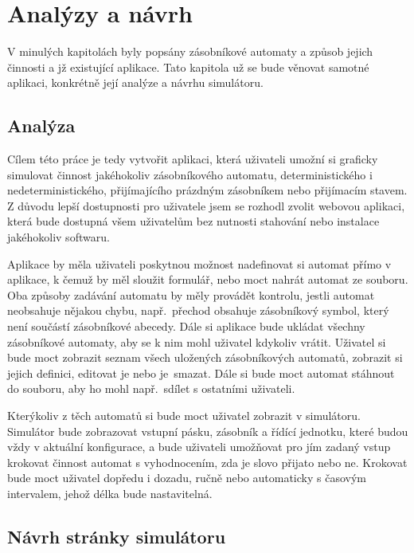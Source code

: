 \chapter{Analýzy a návrh}\label{chap:AppSpecifications}

V minulých kapitolách byly popsány zásobníkové automaty a způsob jejich činnosti a jž existující aplikace. Tato kapitola už se bude věnovat samotné aplikaci, konkrétně její analýze a návrhu simulátoru.

\section{Analýza}

Cílem této práce je tedy vytvořit aplikaci, která uživateli umožní si graficky simulovat činnost jakéhokoliv zásobníkového automatu, deterministického i nedeterministického, přijímajícího prázdným zásobníkem nebo přijímacím stavem. Z důvodu lepší dostupnosti pro uživatele jsem se rozhodl zvolit webovou aplikaci, která bude dostupná všem uživatelům bez nutnosti stahování nebo instalace jakéhokoliv softwaru. 

Aplikace by měla uživateli poskytnou možnost nadefinovat si automat přímo v aplikace, k čemuž by měl sloužit formulář, nebo moct nahrát automat ze souboru. Oba způsoby zadávání automatu by měly provádět kontrolu, jestli automat neobsahuje nějakou chybu, např.~přechod obsahuje zásobníkový symbol, který není součástí zásobníkové abecedy. Dále si aplikace bude ukládat všechny zásobníkové automaty, aby se k nim mohl uživatel kdykoliv vrátit. Uživatel si bude moct zobrazit seznam všech uložených zásobníkových automatů, zobrazit si jejich definici, editovat je nebo je~smazat. Dále si bude moct automat stáhnout do souboru, aby ho mohl např.~sdílet s ostatními uživateli. 

Kterýkoliv z těch automatů si bude moct uživatel zobrazit v simulátoru. Simulátor bude zobrazovat vstupní pásku, zásobník a řídící jednotku, které budou vždy v aktuální konfigurace, a bude uživateli umožňovat pro jím zadaný vstup krokovat činnost automat s vyhodnocením, zda je slovo přijato nebo ne. Krokovat bude moct uživatel dopředu i dozadu, ručně nebo automaticky s časovým intervalem, jehož délka bude nastavitelná.

\section{Návrh stránky simulátoru}


